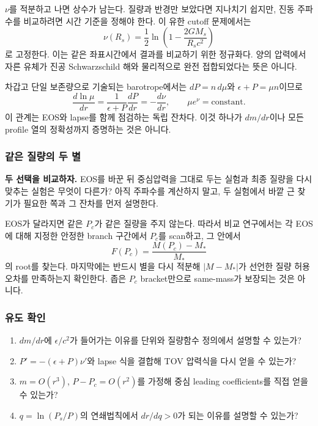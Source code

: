 \documentclass[
  10pt,
  a4paper,
]{article}
\providecommand{\tightlist}{%
  \setlength{\itemsep}{0pt}\setlength{\parskip}{0pt}}
\begin{document}
\(\nu\)를 적분하고 나면 상수가 남는다. 질량과 반경만 보았다면 지나치기
쉽지만, 진동 주파수를 비교하려면 시간 기준을 정해야 한다. 이 유한 cutoff
문제에서는 \[
\nu(R_s)=\frac12\ln\left(1-\frac{2GM_s}{R_sc^2}\right)
\] 로 고정한다. 이는 같은 좌표시간에서 결과를 비교하기 위한 정규화다.
양의 압력에서 자른 유체가 진공 Schwarzschild 해와 물리적으로 완전
접합되었다는 뜻은 아니다.

차갑고 단일 보존량으로 기술되는 barotrope에서는 \(dP=n\,d\mu\)와
\(\epsilon+P=\mu n\)이므로 \[
\frac{d\ln\mu}{dr}=\frac{1}{\epsilon+P}\frac{dP}{dr}=-\frac{d\nu}{dr},
\qquad
\boxed{\mu e^\nu=\mathrm{constant}}.
\] 이 관계는 EOS와 lapse를 함께 점검하는 독립 잔차다. 이것 하나가
\(dm/dr\)이나 모든 profile 열의 정확성까지 증명하는 것은 아니다.

\subsubsection{같은 질량의 두
별}\label{uxac19uxc740-uxc9c8uxb7c9uxc758-uxb450-uxbcc4}

\textbf{두 선택을 비교하자.} EOS를 바꾼 뒤 중심압력을 그대로 두는 실험과
최종 질량을 다시 맞추는 실험은 무엇이 다른가? 아직 주파수를 계산하지
말고, 두 실험에서 바깥 근 찾기가 필요한 쪽과 그 잔차를 먼저 설명한다.

EOS가 달라지면 같은 \(P_c\)가 같은 질량을 주지 않는다. 따라서 비교
연구에서는 각 EOS에 대해 지정한 안정한 branch 구간에서 \(P_c\)를
scan하고, 그 안에서 \[
F(P_c)=\frac{M(P_c)-M_*}{M_*}
\] 의 root를 찾는다. 마지막에는 반드시 별을 다시 적분해 \(|M-M_*|\)가
선언한 질량 허용오차를 만족하는지 확인한다. 좁은 \(P_c\) bracket만으로
same-mass가 보장되는 것은 아니다.

\subsubsection{유도 확인}\label{uxc720uxb3c4-uxd655uxc778}

\begin{enumerate}
\def\labelenumi{\arabic{enumi}.}
\tightlist
\item
  \(dm/dr\)에 \(\epsilon/c^2\)가 들어가는 이유를 단위와 질량함수
  정의에서 설명할 수 있는가?
\item
  \(P'=-(\epsilon+P)\nu'\)와 lapse 식을 결합해 TOV 압력식을 다시 얻을 수
  있는가?
\item
  \(m=O(r^3)\), \(P-P_c=O(r^2)\)를 가정해 중심 leading coefficients를
  직접 얻을 수 있는가?
\item
  \(q=\ln(P_s/P)\)의 연쇄법칙에서 \(dr/dq>0\)가 되는 이유를 설명할 수
  있는가?
\end{enumerate}
\end{document}
